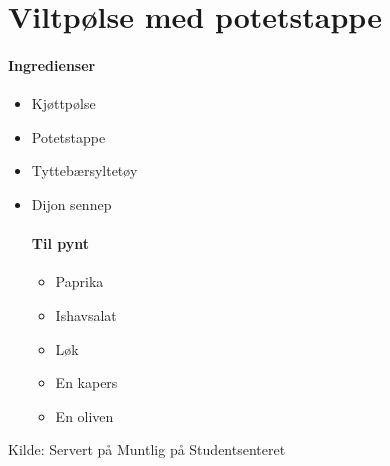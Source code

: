 \section{Viltpølse med potetstappe}


\paragraph{Ingredienser}
\begin{itemize}[noitemsep]
	\item Kjøttpølse
	\item Potetstappe
	\item Tyttebærsyltetøy
	\item Dijon sennep
	      \paragraph{Til pynt}
	      \begin{itemize}[noitemsep]
	      	\item Paprika
	      	\item Ishavsalat
	      	\item Løk
	      	\item En kapers
	      	\item En oliven
	      \end{itemize}
\end{itemize}

Kilde: Servert på Muntlig på Studentsenteret
